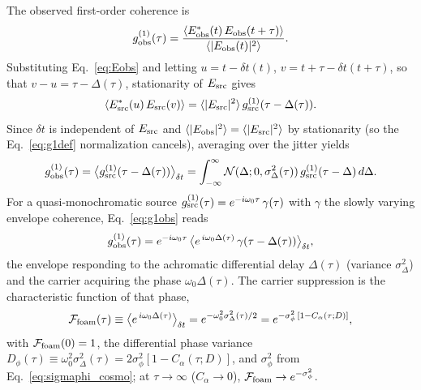 \documentclass[aps,prd,onecolumn,amsmath,amssymb]{revtex4-2}
\begin{document}
The observed first-order coherence is
\begin{equation}
  g^{(1)}_{\rm obs}(\tau) = \frac{\langle E^*_{\rm obs}(t)\,E_{\rm obs}(t+\tau)\rangle}
                                  {\langle|E_{\rm obs}(t)|^2\rangle}.
  \label{eq:g1def}
\end{equation}
Substituting Eq.~\eqref{eq:Eobs} and letting
$u = t - \delta t(t)$, $v = t+\tau - \delta t(t+\tau)$, so that
$v - u = \tau - \Delta(\tau)$, stationarity of $E_{\rm src}$ gives
\begin{equation}
  \langle E^*_{\rm src}(u)\,E_{\rm src}(v)\rangle
  = \langle|E_{\rm src}|^2\rangle\,g^{(1)}_{\rm src}(\tau - \Delta(\tau)).
\end{equation}
Since $\delta t$ is independent of $E_{\rm src}$ and
$\langle|E_{\rm obs}|^2\rangle=\langle|E_{\rm src}|^2\rangle$ by stationarity
(so the Eq.~\eqref{eq:g1def} normalization cancels), averaging over the
jitter yields
\begin{equation}
  g^{(1)}_{\rm obs}(\tau)
    = \big\langle g^{(1)}_{\rm src}(\tau - \Delta(\tau))\big\rangle_{\delta t}
    = \int_{-\infty}^{\infty} \mathcal{N}(\Delta;0,\sigma_\Delta^2(\tau))\,
      g^{(1)}_{\rm src}(\tau - \Delta)\,d\Delta.
  \label{eq:g1obs}
\end{equation}
For a quasi-monochromatic source $g^{(1)}_{\rm src}(\tau)=e^{-i\omega_0\tau}\,
\gamma(\tau)$ with $\gamma$ the slowly varying envelope coherence,
Eq.~\eqref{eq:g1obs} reads
\begin{equation}
  g^{(1)}_{\rm obs}(\tau)
    = e^{-i\omega_0\tau}\,
      \big\langle e^{\,i\omega_0\Delta(\tau)}\,
                  \gamma(\tau-\Delta(\tau))\big\rangle_{\delta t},
  \label{eq:g1obs_carrier}
\end{equation}
the envelope responding to the achromatic differential delay $\Delta(\tau)$
(variance $\sigma_\Delta^2$) and the carrier acquiring the phase
$\omega_0\Delta(\tau)$.  The carrier suppression is the characteristic function
of that phase,
\begin{equation}
  \mathcal{F}_{\rm foam}(\tau)\equiv\big\langle e^{\,i\omega_0\Delta(\tau)}\big\rangle_{\delta t}
  = e^{-\omega_0^2\sigma_\Delta^2(\tau)/2}
  = e^{-\sigma_\phi^2\,[1-C_\alpha(\tau;D)]},
  \label{eq:Ffoam}
\end{equation}
with $\mathcal{F}_{\rm foam}(0)=1$, the differential phase variance
$D_\phi(\tau)\equiv\omega_0^2\sigma_\Delta^2(\tau)=2\sigma_\phi^2[1-C_\alpha(\tau;D)]$,
and $\sigma_\phi^2$ from Eq.~\eqref{eq:sigmaphi_cosmo}; at $\tau\to\infty$
($C_\alpha\to0$), $\mathcal{F}_{\rm foam}\to e^{-\sigma_\phi^2}$.
\end{document}
